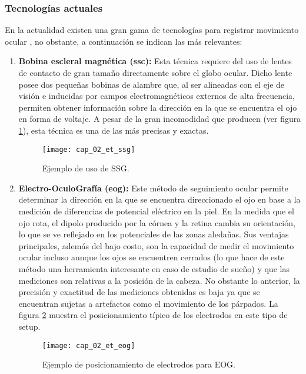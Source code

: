 \documentclass[../main.tex]{subfiles}
\begin{document}
			\subsubsection{Tecnologías actuales}
			\label{ssub:02_tecnologias_actuales}

				En la actualidad existen una gran gama de tecnologías para registrar movimiento ocular \cite{article:eyetracker_eggert, article:eyetracker_richardson, dissertation:eyetrackers}, no obstante, a continuación se indican las más relevantes: 
				\begin{enumerate}
					\item \textbf{Bobina escleral magnética (\acrshort{ssc}):} Esta técnica requiere del uso de lentes de contacto de gran tamaño directamente sobre el globo ocular. Dicho lente posee dos pequeñas bobinas de alambre que, al ser alineadas con el eje de visión e inducidas por campos electromagnéticos externos de alta frecuencia, permiten obtener información sobre la dirección en la que se encuentra el ojo en forma de voltaje. A pesar de la gran incomodidad que producen (ver figura \ref{fig:02_et_ssc}), esta técnica es una de las más precisas y exactas. 
					\begin{figure}[H]
						\centering
						\texttt{[image: cap\_02\_et\_ssg]}
						\caption[Ejemplo de uso de SSG]{Ejemplo de uso de SSG\footnotemark.}
						\label{fig:02_et_ssc}
					\end{figure}

					\item \textbf{Electro-OculoGrafía (\acrshort{eog}):} Este método de seguimiento ocular permite determinar la dirección en la que se encuentra direccionado el ojo en base a la medición de diferencias de potencial eléctrico en la piel. En la medida que el ojo rota, el dipolo producido por la córnea y la retina cambia su orientación, lo que se ve reflejado en los potenciales de las zonas aledañas. Sus ventajas principales, además del bajo costo, son la capacidad de medir el movimiento ocular incluso aunque los ojos se encuentren cerrados (lo que hace de este método una herramienta interesante en caso de estudio de sueño) y que las mediciones son relativas a la posición de la cabeza. No obstante lo anterior, la precisión y exactitud de las mediciones obtenidas es baja ya que se encuentran sujetas a artefactos como el movimiento de los párpados. La figura \ref{fig:02_et_eog} muestra el posicionamiento típico de los electrodos en este tipo de setup. 
					\begin{figure}[H]
						\centering
						\texttt{[image: cap\_02\_et\_eog]}
						\caption[Ejemplo de posicionamiento de electrodos para EOG]{Ejemplo de posicionamiento de electrodos para EOG\footnotemark.}
						\label{fig:02_et_eog}
					\end{figure}


\end{enumerate}
\end{document}
